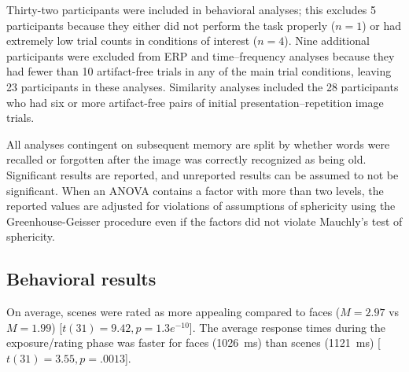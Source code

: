Thirty-two participants were included in behavioral analyses; this excludes 5 participants because they either did not perform the task properly ($n=1$) or had extremely low trial counts in conditions of interest ($n=4$).  Nine additional participants were excluded from ERP and time--frequency analyses because they had fewer than 10 artifact-free trials in any of the main trial conditions,
leaving 23 participants in these analyses.  Similarity analyses included the 28 participants who had six or more artifact-free pairs of initial presentation--repetition image trials.

All analyses contingent on subsequent memory are split by whether words were recalled or forgotten after the image was correctly recognized as being old.
Significant results are reported, and unreported results can be assumed to not be significant.
When an ANOVA contains a factor with more than two levels, the reported values are adjusted for violations of assumptions of sphericity using the Greenhouse-Geisser procedure \cite{GreeGeis1959} even if the factors did not violate Mauchly's test of sphericity.

\subsection{Behavioral results}

On average, scenes were rated as more appealing compared to faces ($M=2.97$ vs $M=1.99$) [$t(31)=9.42, p=1.3e^{-10}$].  The average response times during the exposure/rating phase was faster for faces (1026~ms) than scenes (1121~ms) [$t(31)=3.55, p=.0013$].


